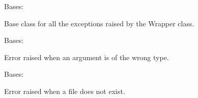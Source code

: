 \documentclass[letterpaper,10pt,english]{sphinxmanual}
\begin{document}
\begin{fulllineitems}
\label{\detokenize{source/_autosummary/HDF5_BLS.errors:HDF5_BLS.errors.WrapperError}}
\pysigstartsignatures
\pysiglinewithargsret
{}
{}
{}
\pysigstopsignatures
\sphinxAtStartPar
Bases: 

\sphinxAtStartPar
Base class for all the exceptions raised by the Wrapper class.

\end{fulllineitems}


\begin{fulllineitems}
\label{\detokenize{source/_autosummary/HDF5_BLS.errors:HDF5_BLS.errors.WrapperError_ArgumentType}}
\pysigstartsignatures
\pysiglinewithargsret
{}
{}
{}
\pysigstopsignatures
\sphinxAtStartPar
Bases: {\hyperref[\detokenize{source/_autosummary/HDF5_BLS.errors:HDF5_BLS.errors.WrapperError}]{}}

\sphinxAtStartPar
Error raised when an argument is of the wrong type.

\end{fulllineitems}


\begin{fulllineitems}
\label{\detokenize{source/_autosummary/HDF5_BLS.errors:HDF5_BLS.errors.WrapperError_FileNotFound}}
\pysigstartsignatures
\pysiglinewithargsret
{}
{}
{}
\pysigstopsignatures
\sphinxAtStartPar
Bases: {\hyperref[\detokenize{source/_autosummary/HDF5_BLS.errors:HDF5_BLS.errors.WrapperError}]{}}

\sphinxAtStartPar
Error raised when a file does not exist.

\end{fulllineitems}
\end{document}
